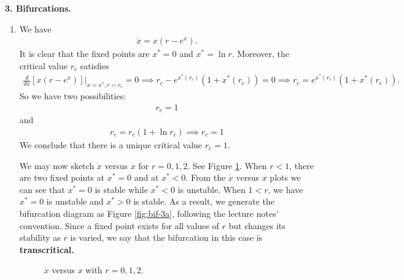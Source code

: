 \documentclass{article}
\theoremstyle{definition}
\newcommand{\f}[2]{\frac{#1}{#2}}
\newcommand{\lb}{\left[}
\newcommand{\rb}{\right]}
\begin{document}
\noindent \textbf{3. Bifurcations.}

\begin{enumerate}[label=(\alph*)]
	
	
	\item We have
	\begin{align*}
	\dot x = x(r - e^x).
	\end{align*}
	It is clear that the fixed points are $x^* = 0$ and $x^* = \ln r$. Moreover, the critical value $r_c$ satisfies
	\begin{align*}
	\f{d}{dx} \lb x(r-e^x) \rb\bigg\vert_{x=x^*, r = r_c} = 0 \implies r_c - e^{x^*(r_c)} (1+x^*(r_c))= 0 \implies r_c = e^{x^*(r_c)} (1+x^*(r_c)).
	\end{align*}
	So we have two possibilities:
	\begin{align*}
	{r_c = 1}
	\end{align*}
	and
	\begin{align*}
	r_c = r_c(1+\ln r_c) \implies {r_c = 1} 
	\end{align*}
	We conclude that there is a unique critical value $\boxed{r_c = 1}$.
	
	
	We may now sketch $\dot x$ versus $x$ for $r = 0, 1, 2$. See Figure \ref{fig:3a1}. When $r<1$, there are two fixed points at $x^*=0$ and at $x^*<0$. From the $\dot x$ versus $x$ plots we can see that $x^*=0$ is stable while $x^* < 0$ is unstable. When $1<r$, we have $x^* = 0$ is unstable and $x^* > 0$ is stable.  As a result, we generate the bifurcation diagram as Figure \ref{fig:bif-3a}, following the lecture notes' convention.  Since a fixed point exists for all values of $r$ but changes its stability as $r$ is varied, we say that the bifurcation in this case is \textbf{transcritical.}
	\begin{figure}[!htb]
		\centering
	\caption{$\dot x$ versus $x$ with $r=0,1,2$.}
	\label{fig:3a1}
	\end{figure}
	

\end{enumerate}
\end{document}
